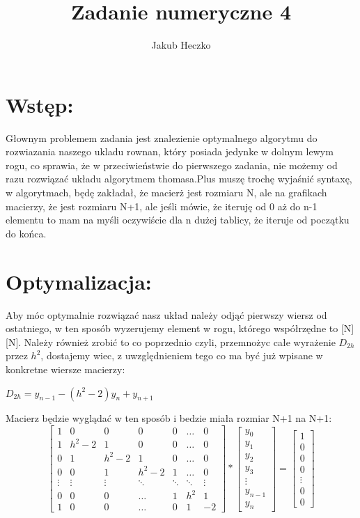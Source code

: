 \documentclass[12pt]{article}
\title{Zadanie numeryczne 4}
\author{Jakub Heczko}
\date{}
\begin{document}
\section{Wstęp:}
Głownym problemem zadania jest znalezienie optymalnego algorytmu do rozwiazania naszego ukladu rownan, który posiada jedynke w dolnym lewym rogu, co sprawia, że w przeciwieństwie do pierwszego zadania, nie możemy od razu rozwiązać układu algorytmem thomasa.Plus muszę trochę wyjaśnić syntaxę, w algorytmach, będę zakładał, że macierż jest rozmiaru N, ale na grafikach macierzy, że jest rozmiaru N+1, ale jeśli mówie, że iteruję od 0 aż do n-1 elementu to mam na myśli oczywiście dla n dużej tablicy, że iteruje od początku do końca.
\section{Optymalizacja:}
Aby móc optymalnie rozwiązać nasz układ należy odjąć pierwszy wiersz od ostatniego, w ten sposób wyzerujemy element w rogu, którego współrzędne to [N][N]. Należy również zrobić to co poprzednio czyli, przemnożyc całe wyrażenie $D_{2h}$ przez $h^{2}$, dostajemy wiec, z uwzględnieniem tego co ma być już wpisane w konkretne wiersze macierzy:
\newline
\begin{center}
    $D_{2h} = y_{n-1} - (h^{2} - 2)y_{n} + y_{n+1}$
\end{center}
Macierz będzie wyglądać w ten sposób i bedzie miała rozmiar N+1 na N+1:
\[
\begin{bmatrix}
    1 & 0 & 0 & 0 & 0 & \dots & 0\\
    1 & h^{2}-2 & 1 & 0 & 0 & \dots & 0\\ 
    0 & 1 & h^{2}-2 & 1 & 0 & \dots & 0\\
    0 & 0 & 1 & h^{2}-2 & 1 &\dots & 0\\
    \vdots & \vdots & \vdots & \ddots & \ddots & \ddots & \vdots\\
    0 & 0 & 0 & \hdots & 1 & h^{2} & 1\\
    1 & 0 & 0 & \hdots & 0 & 1 & -2
\end{bmatrix}
*
\begin{bmatrix}
    y_{0}\\
    y_{1}\\
    y_{2}\\
    y_{3}\\
    \vdots\\
    y_{n-1}\\
    y_{n}
\end{bmatrix}
=
\begin{bmatrix}
    1\\
    0\\
    0\\
    0\\
    \vdots\\
    0\\
    0
\end{bmatrix}
\]
\end{document}
